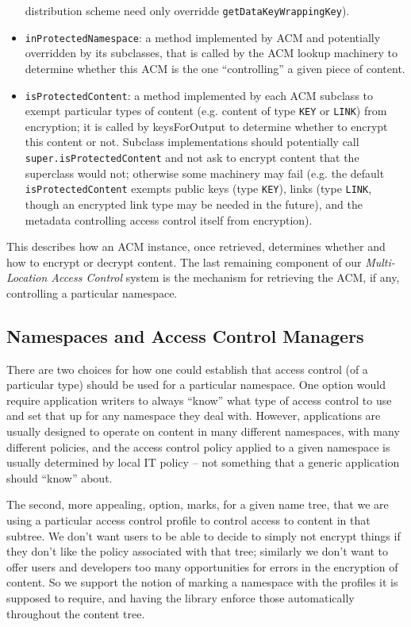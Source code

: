 \begin{itemize}
  distribution scheme need only overridde {\tt getDataKeyWrappingKey}).
\item {\tt inProtectedNamespace}: a method implemented by ACM and potentially overridden by its subclasses,
  that is called by the ACM lookup machinery to determine whether this ACM is the one ``controlling''
  a given piece of content.
\item {\tt isProtectedContent}: a method implemented by each ACM subclass to exempt particular types
  of content (e.g. content of type {\tt KEY} or {\tt LINK}) from encryption; it is called by keysForOutput
  to determine whether to encrypt this content or not. Subclass implementations should potentially call
  {\tt super.isProtectedContent} and not ask to encrypt content that the superclass would not; otherwise
  some machinery may fail (e.g. the default {\tt isProtectedContent} exempts public keys (type {\tt KEY}),
  links (type {\tt LINK}, though an encrypted link type may be needed in the future), and the metadata
  controlling access control itself from encryption).
\end{itemize}

This describes how an ACM instance, once retrieved, determines whether and how to encrypt or
decrypt content. The last remaining component of our \emph{Multi-Location Access Control} system
is the mechanism for retrieving the ACM, if any, controlling a particular namespace.

\subsection{Namespaces and Access Control Managers}
\label{sec:namespaces}

There are two choices for how one could establish that access control (of a particular
type) should be used for a particular namespace. One option would require application writers
to always ``know'' what type of access control to use and set that up for any namespace they
deal with. However, applications are usually designed to operate on content in many different
namespaces, with many different policies, and the access control policy applied to a given
namespace is usually determined by local IT policy -- not something that a generic application
should ``know'' about. 

The second, more appealing, option, marks, for a given name tree, that
we are using a particular access control profile to control access to
content in that subtree. We don't want users to be able to decide to
simply not encrypt things if they don't like the policy associated
with that tree; similarly we don't want to offer users and developers
too many opportunities for errors in the encryption of content. So we
support the notion of marking a namespace with the profiles it is
supposed to require, and having the library enforce those
automatically throughout the content tree.

